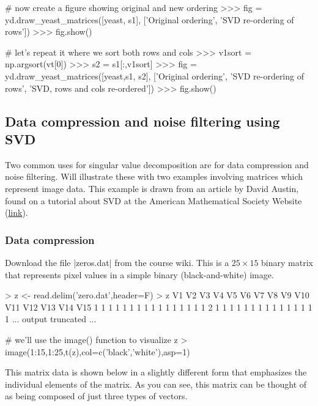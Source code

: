 \begin{R}
\begin{python}
# now create a figure showing original and new ordering
>>> fig = yd.draw_yeast_matrices([yeast, s1],
            ['Original ordering', 'SVD re-ordering of rows'])
>>> fig.show()

# let's repeat it where we sort both rows and cols
>>> v1sort = np.argsort(vt[0])
>>> s2 = s1[:,v1sort]
>>> fig = yd.draw_yeast_matrices([yeast,s1, s2],
        ['Original ordering', 'SVD re-ordering of rows',
        'SVD, rows and cols re-ordered'])
>>> fig.show()
\end{python}

\subsection{Data compression and noise filtering using SVD}

Two common uses for singular value decomposition are for data compression and noise filtering. Will illustrate these with two examples involving matrices which represent image data. This example is drawn from an article by David Austin, found on a tutorial about SVD at the American Mathematical Society Website (\href{http://www.ams.org/samplings/feature-column/fcarc-svd}{link}).

\subsubsection{Data compression}

Download the file |zeros.dat| from the course wiki. This is a $25 \times 15$ binary matrix that represents pixel values in a simple binary (black-and-white) image.

\begin{R}
> z <- read.delim('zero.dat',header=F)
> z
   V1 V2 V3 V4 V5 V6 V7 V8 V9 V10 V11 V12 V13 V14 V15
1   1  1  1  1  1  1  1  1  1   1   1   1   1   1   1
2   1  1  1  1  1  1  1  1  1   1   1   1   1   1   1
... output truncated ...

# we'll use the image() function to visualize z
> image(1:15,1:25,t(z),col=c('black','white'),asp=1)    
\end{R}

This matrix data is shown below in a slightly different form that emphasizes the individual elements of the matrix.  As you can see, this matrix can be thought of as being composed of just three types of vectors.



\end{R}
